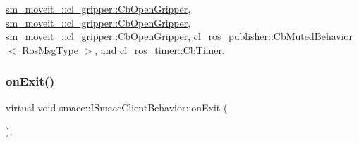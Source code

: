 \hyperlink{classsm__moveit__2_1_1cl__gripper_1_1CbOpenGripper_aaa18f60580c10e891b572f61f85ffb05}{sm\+\_\+moveit\+\_\+::cl\+\_\+gripper\+::\+Cb\+Open\+Gripper}, \hyperlink{classsm__moveit__3_1_1cl__gripper_1_1CbOpenGripper_abed7a0ca4de88c6b0e02e7271cb552f3}{sm\+\_\+moveit\+\_\+::cl\+\_\+gripper\+::\+Cb\+Open\+Gripper}, \hyperlink{classsm__moveit__4_1_1cl__gripper_1_1CbOpenGripper_a246d23aea688d231e7f5197746608afc}{sm\+\_\+moveit\+\_\+::cl\+\_\+gripper\+::\+Cb\+Open\+Gripper}, \hyperlink{classcl__ros__publisher_1_1CbMutedBehavior_a79376d9160e3bd44678a2c0d89f1b4de}{cl\+\_\+ros\+\_\+publisher\+::\+Cb\+Muted\+Behavior$<$ Ros\+Msg\+Type $>$}, and \hyperlink{classcl__ros__timer_1_1CbTimer_aceba45e86271cf1b7333e2f42c246a38}{cl\+\_\+ros\+\_\+timer\+::\+Cb\+Timer}.

\mbox{\label{classsmacc_1_1ISmaccClientBehavior_a753cfd7b96539419559f619d552723f1}} 
\subsubsection{\texorpdfstring{on\+Exit()}{onExit()}}
{\footnotesize\ttfamily virtual void smacc\+::\+I\+Smacc\+Client\+Behavior\+::on\+Exit (\begin{DoxyParamCaption}{ }\end{DoxyParamCaption})\hspace{0.3cm}{\ttfamily [protected]}, {}}



